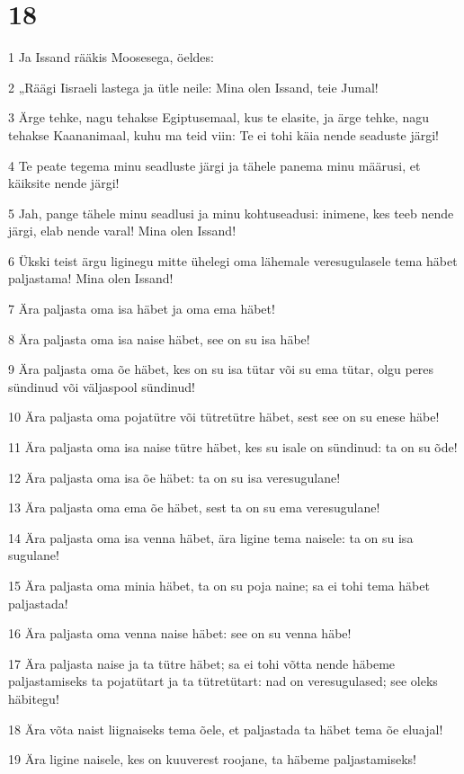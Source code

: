 \chapter{18}

\par 1 Ja Issand rääkis Moosesega, öeldes:
\par 2 „Räägi Iisraeli lastega ja ütle neile: Mina olen Issand, teie Jumal!
\par 3 Ärge tehke, nagu tehakse Egiptusemaal, kus te elasite, ja ärge tehke, nagu tehakse Kaananimaal, kuhu ma teid viin: Te ei tohi käia nende seaduste järgi!
\par 4 Te peate tegema minu seadluste järgi ja tähele panema minu määrusi, et käiksite nende järgi!
\par 5 Jah, pange tähele minu seadlusi ja minu kohtuseadusi: inimene, kes teeb nende järgi, elab nende varal! Mina olen Issand!
\par 6 Ükski teist ärgu liginegu mitte ühelegi oma lähemale veresugulasele tema häbet paljastama! Mina olen Issand!
\par 7 Ära paljasta oma isa häbet ja oma ema häbet!
\par 8 Ära paljasta oma isa naise häbet, see on su isa häbe!
\par 9 Ära paljasta oma õe häbet, kes on su isa tütar või su ema tütar, olgu peres sündinud või väljaspool sündinud!
\par 10 Ära paljasta oma pojatütre või tütretütre häbet, sest see on su enese häbe!
\par 11 Ära paljasta oma isa naise tütre häbet, kes su isale on sündinud: ta on su õde!
\par 12 Ära paljasta oma isa õe häbet: ta on su isa veresugulane!
\par 13 Ära paljasta oma ema õe häbet, sest ta on su ema veresugulane!
\par 14 Ära paljasta oma isa venna häbet, ära ligine tema naisele: ta on su isa sugulane!
\par 15 Ära paljasta oma minia häbet, ta on su poja naine; sa ei tohi tema häbet paljastada!
\par 16 Ära paljasta oma venna naise häbet: see on su venna häbe!
\par 17 Ära paljasta naise ja ta tütre häbet; sa ei tohi võtta nende häbeme paljastamiseks ta pojatütart ja ta tütretütart: nad on veresugulased; see oleks häbitegu!
\par 18 Ära võta naist liignaiseks tema õele, et paljastada ta häbet tema õe eluajal!
\par 19 Ära ligine naisele, kes on kuuverest roojane, ta häbeme paljastamiseks!
